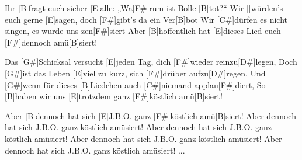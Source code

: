 \begin{guitar}
	Ihr [B]fragt euch sicher [E]alle: „Wa[F#]rum ist Bolle [B]tot?“
	Wir []würden's euch gerne [E]sagen, doch [F#]gibt’s da ein Ver[B]bot
	Wir [C#]dürfen es nicht singen, es wurde uns zen[F#]siert
	Aber [B]hoffentlich hat [E]dieses Lied euch [F#]dennoch amü[B]siert! 
	
	\begin{highlightbar}
		Das [G#]Schicksal versucht [E]jeden Tag, dich [F#]wieder reinzu[D#]legen,
		Doch [G#]ist das Leben [E]viel zu kurz, sich [F#]drüber aufzu[D#]regen.
		Und [G#]wenn für dieses [B]Liedchen auch [C#]niemand applau[F#]diert,
		So [B]haben wir uns [E]trotzdem ganz [F#]köstlich amü[B]siert!
	\end{highlightbar}

	Aber [B]dennoch hat sich [E]J.B.O. ganz [F#]köstlich amü[B]siert!
	Aber dennoch hat sich J.B.O. ganz köstlich amüsiert!
	Aber dennoch hat sich J.B.O. ganz köstlich amüsiert!
	Aber dennoch hat sich J.B.O. ganz köstlich amüsiert!
	Aber dennoch hat sich J.B.O. ganz köstlich amüsiert!
	...	
	
\end{guitar}